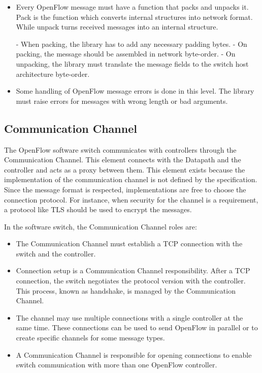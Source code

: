     \begin{itemize}
    
    \item Every OpenFlow message must have a function that packs and unpacks it. Pack is the function which converts internal structures into network format. While unpack turns received messages into an internal structure.
    
        \subitem - When packing, the library has to add any necessary padding bytes.
        \subitem - On packing, the message should be assembled in network byte-order.
        \subitem - On unpacking, the library must translate the message fields to the switch host architecture byte-order.
    
    \item Some handling of OpenFlow message errors is done in this level. The library must raise errors for messages with wrong length or bad arguments. 
    
    \end{itemize}

    \subsection{Communication Channel}	

    The OpenFlow software switch communicates with controllers through the Communication Channel. This element connects with the Datapath and the controller and acts as a proxy between them. This element exists because the implementation of the communication channel is not defined by the specification. Since the message format is respected, implementations are free to choose the connection protocol. For instance, when security for the channel is a requirement, a protocol like TLS should be used to encrypt the messages. 
    
    In the software switch, the Communication Channel roles are:
    
    \begin{itemize}
    
    \item The Communication Channel must establish a TCP connection with the switch and the controller.
    
    \item Connection setup is a Communication Channel responsibility. After a TCP connection, the switch negotiates the protocol version with the controller. This process, known as handshake, is managed by the Communication Channel. 
    
    \item The channel may use multiple connections with a single controller at the same time. These connections can be used to send OpenFlow in parallel or to create specific channels for some message types.
    
    \item A Communication Channel is responsible for opening connections to enable switch communication with more than one OpenFlow controller. 
    
    \end{itemize}
    
    
    